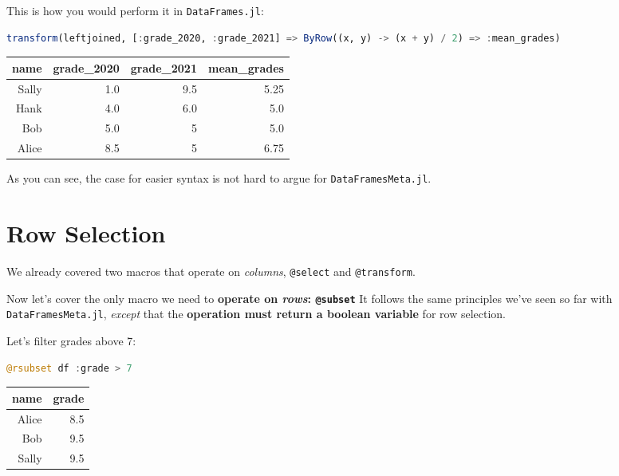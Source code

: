 \documentclass[
  notoc %
]{tufte-book}
\newcommand{\passthrough}[1]{#1}
\begin{document}
This is how you would perform it in
\passthrough{\lstinline!DataFrames.jl!}:

\begin{lstlisting}[language=Julia]
transform(leftjoined, [:grade_2020, :grade_2021] => ByRow((x, y) -> (x + y) / 2) => :mean_grades)
\end{lstlisting}

\begin{longtable}[]{@{}rrrr@{}}
\toprule
name & grade\_2020 & grade\_2021 & mean\_grades \\
\midrule
\endhead
Sally & 1.0 & 9.5 & 5.25 \\
Hank & 4.0 & 6.0 & 5.0 \\
Bob & 5.0 & 5 & 5.0 \\
Alice & 8.5 & 5 & 6.75 \\
\bottomrule
\end{longtable}

As you can see, the case for easier syntax is not hard to argue for
\passthrough{\lstinline!DataFramesMeta.jl!}.

\hypertarget{sec:dataframesmeta_subset}{%
\section{Row Selection}\label{sec:dataframesmeta_subset}}

We already covered two macros that operate on \emph{columns},
\passthrough{\lstinline!@select!} and
\passthrough{\lstinline!@transform!}.

Now let's cover the only macro we need to \textbf{operate on
\emph{rows}: \passthrough{\lstinline!@subset!}} It follows the same
principles we've seen so far with
\passthrough{\lstinline!DataFramesMeta.jl!}, \emph{except} that the
\textbf{operation must return a boolean variable} for row selection.

Let's filter grades above 7:

\begin{lstlisting}[language=Julia]
@rsubset df :grade > 7
\end{lstlisting}

\begin{longtable}[]{@{}rr@{}}
\toprule
name & grade \\
\midrule
\endhead
Alice & 8.5 \\
Bob & 9.5 \\
Sally & 9.5 \\
\bottomrule
\end{longtable}
\end{document}

